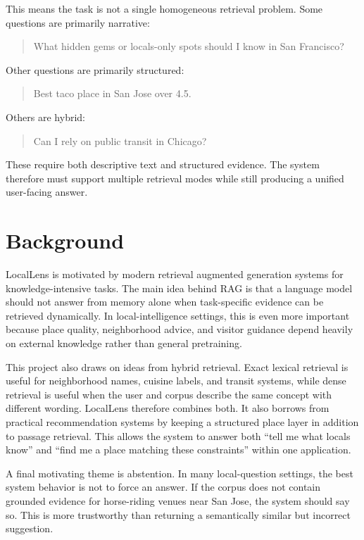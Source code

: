 \documentclass[11pt]{article}
\begin{document}
This means the task is not a single homogeneous retrieval problem. Some questions are primarily narrative:
\begin{quote}
What hidden gems or locals-only spots should I know in San Francisco?
\end{quote}
Other questions are primarily structured:
\begin{quote}
Best taco place in San Jose over 4.5.
\end{quote}
Others are hybrid:
\begin{quote}
Can I rely on public transit in Chicago?
\end{quote}
These require both descriptive text and structured evidence. The system therefore must support multiple retrieval modes while still producing a unified user-facing answer.

\section{Background}
LocalLens is motivated by modern retrieval augmented generation systems for knowledge-intensive tasks. The main idea behind RAG is that a language model should not answer from memory alone when task-specific evidence can be retrieved dynamically. In local-intelligence settings, this is even more important because place quality, neighborhood advice, and visitor guidance depend heavily on external knowledge rather than general pretraining.

This project also draws on ideas from hybrid retrieval. Exact lexical retrieval is useful for neighborhood names, cuisine labels, and transit systems, while dense retrieval is useful when the user and corpus describe the same concept with different wording. LocalLens therefore combines both. It also borrows from practical recommendation systems by keeping a structured place layer in addition to passage retrieval. This allows the system to answer both ``tell me what locals know'' and ``find me a place matching these constraints'' within one application.

A final motivating theme is abstention. In many local-question settings, the best system behavior is not to force an answer. If the corpus does not contain grounded evidence for horse-riding venues near San Jose, the system should say so. This is more trustworthy than returning a semantically similar but incorrect suggestion.
\end{document}
